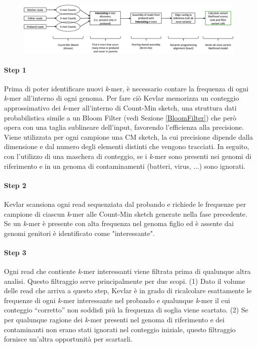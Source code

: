\documentclass[../main.tex]{subfiles}
\begin{document}
\begin{figure}[ht!]
	\centering
  	\captionsetup{justification=centering}
  	\includegraphics[scale=.27]{images/kevlar_pipeline.png}
  	\caption{}
  	\label{fig:kevlar_pipeline}
\end{figure}

\noindent
\paragraph{Step 1} Prima di poter identificare nuovi \textit{k}-mer, è necessario contare la frequenza di ogni \textit{k}-mer all'interno di ogni genoma. Per fare ciò Kevlar memorizza un conteggio approssimativo dei \textit{k}-mer all'interno di Count-Min sketch, una struttura dati probabilistica simile a un Bloom Filter (vedi Sezione \ref{BloomFilter}) che però opera con una taglia sublineare dell'input, favorendo l'efficienza alla precisione. Viene utilizzata per ogni campione una CM sketch, la cui precisione dipende dalla dimensione e dal numero degli elementi distinti che vengono tracciati. In seguito, con l'utilizzo di una maschera di conteggio, se i \textit{k}-mer sono presenti nei genomi di riferimento e in un genoma di contaminamenti (batteri, virus, ...) sono ignorati.

\paragraph{Step 2} Kevlar scansiona ogni read sequenziata dal probando e richiede le frequenze per campione di ciascun \textit{k}-mer alle Count-Min sketch generate nella fase precedente. Se un \textit{k}-mer è presente con alta frequenza nel genoma figlio ed è assente dai genomi genitori è identificato come "interessante". 

\paragraph{Step 3} Ogni read che contiente \textit{k}-mer interessanti viene filtrata prima di qualunque altra analisi. Questo filtraggio serve principalmente per due scopi. (1) Dato il volume delle read che arriva a questo step, Kevlar è in grado di ricalcolare esattamente le frequenze di ogni \textit{k}-mer interessante nel probando e qualunque \textit{k}-mer il cui conteggio ``corretto'' non soddisfi più la frequenza di soglia viene scartato. (2) Se per qualunque ragione dei \textit{k}-mer presenti nel genoma di riferimento e dei contaminanti non erano stati ignorati nel conteggio iniziale, questo filtraggio fornisce un'altra opportunità per scartarli. 
\end{document}
